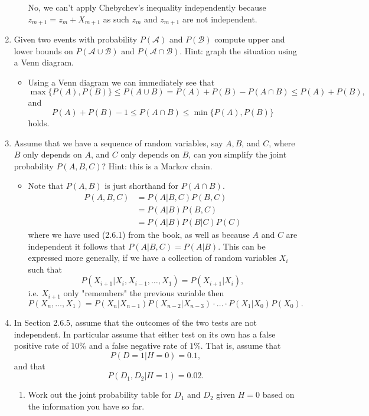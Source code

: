 \documentclass{article}
\begin{document}
\begin{enumerate}
\begin{itemize}
$$			$$
			No, we can't apply Chebychev's inequality independently because $z_{m + 1} = z_m + X_{m + 1}$ as such $z_m$ and $z_{m + 1}$ are not independent.
		\end{itemize}
	\item Given two events with probability $P(\mathcal{A})$ and $P(\mathcal{B})$ compute upper and lower bounds on $P(\mathcal{A} \cup \mathcal{B})$ and $P(\mathcal{A} \cap \mathcal{B})$. Hint: graph the situation using a Venn diagram.
		\begin{itemize}
			\item Using a Venn diagram we can immediately see that
			$$
			\max\{P(A), P(B) \} \leq P(A \cup B) = P(A) + P(B) - P(A \cap B) \leq P(A) + P(B),
			$$
			and
			$$
			P(A) + P(B) - 1 \leq P(A \cap B) \leq \min\{P(A), P(B)\}
			$$
			holds.
		\end{itemize}
	\item Assume that we have a sequence of random variables, say $A, B$, and $C$, where $B$ only depends on $A$, and $C$ only depends on $B$, can you simplify the joint probability $P(A, B, C)$? Hint: this is a Markov chain.
		\begin{itemize}
			\item Note that $P(A, B)$ is just shorthand for $P(A \cap B)$.
			\begin{align*}
			P(A, B, C) &= P(A|B, C) P(B, C) \\
			&= P(A|B) P(B, C) \\
			&= P(A|B) P(B|C) P(C)
			\end{align*}
			where we have used (2.6.1) from the book, as well as because $A$ and $C$ are independent it follows that $P(A|B, C) = P(A|B)$. This can be expressed more generally, if we have a collection of random variables $X_i$ such that
			$$
			P(X_{i + 1} | X_i, X_{i - 1}, \dots, X_1) = P(X_{i + 1}| X_i),
			$$
			i.e. $X_{i + 1}$ only "remembers" the previous variable then
			$$
			P(X_n, \dots, X_1) = P(X_n|X_{n - 1})P(X_{n - 2}|X_{n - 3})\cdot \dots \cdot P(X_1|X_0)P(X_0).
			$$
		\end{itemize}
	\item In Section 2.6.5, assume that the outcomes of the two tests are not independent. In particular assume that either test on its own has a false positive rate of $10\%$ and a false negative rate of $1\%$. That is, assume that
	$$
	P(D = 1 | H = 0) = 0.1,
	$$
	and that
	$$
	P(D_1, D_2 | H = 1) = 0.02.
	$$
	\begin{enumerate}
		\item Work out the joint probability table for $D_1$ and $D_2$ given $H = 0$ based on the information you have so far.

\end{enumerate}
\end{enumerate}
\end{document}
